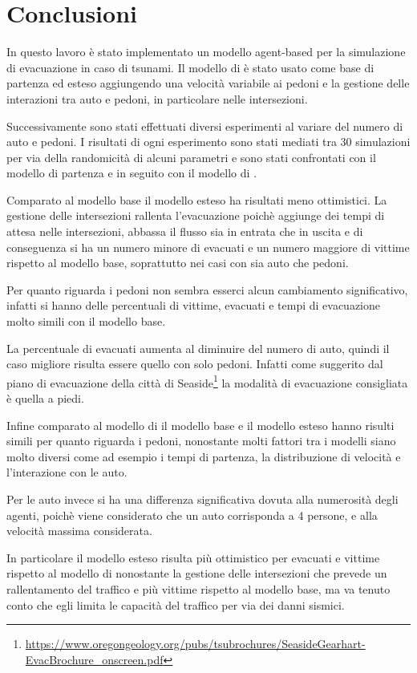\section{Conclusioni}
\label{sec:conclusione}
In questo lavoro è stato implementato un modello agent-based per la simulazione di evacuazione in caso di tsunami.
Il modello di \textcite{wang2016agent} è stato usato come base di partenza ed esteso aggiungendo una velocità
variabile ai pedoni e la gestione delle interazioni tra auto e pedoni, in particolare nelle intersezioni.

Successivamente sono stati effettuati diversi esperimenti al variare del numero di auto e pedoni.
I risultati di ogni esperimento sono stati mediati tra 30 simulazioni per via della randomicità di alcuni parametri
e sono stati confrontati con il modello di partenza e in seguito con il modello di \textcite{wang2021novel}.

Comparato al modello base il modello esteso ha risultati meno ottimistici.
La gestione delle intersezioni rallenta l'evacuazione poichè aggiunge dei tempi di attesa nelle intersezioni,
abbassa il flusso sia in entrata che in uscita e di conseguenza si ha un numero minore di evacuati e
un numero maggiore di vittime rispetto al modello base, soprattutto nei casi con sia auto che pedoni.

Per quanto riguarda i pedoni non sembra esserci alcun cambiamento significativo,
infatti si hanno delle percentuali di vittime, evacuati e tempi di evacuazione molto simili con il modello base.

La percentuale di evacuati aumenta al diminuire del numero di auto, quindi il caso migliore risulta essere quello con solo pedoni.
Infatti come suggerito dal piano di evacuazione della città di Seaside\footnote{\url{https://www.oregongeology.org/pubs/tsubrochures/SeasideGearhart-EvacBrochure_onscreen.pdf}}
la modalità di evacuazione consigliata è quella a piedi.

Infine comparato al modello di \textcite{wang2021novel} il modello base e il modello esteso hanno risulti simili per quanto riguarda i pedoni, nonostante
molti fattori tra i modelli siano molto diversi come ad esempio i tempi di partenza, la distribuzione di velocità e l'interazione con le auto.

Per le auto invece si ha una differenza significativa dovuta alla numerosità degli agenti, poichè viene considerato che un auto corrisponda a 4 persone, e alla 
velocità massima considerata. 

In particolare il modello esteso risulta più ottimistico per evacuati e vittime rispetto al modello di \textcite{wang2021novel} nonostante la gestione delle intersezioni
che prevede un rallentamento del traffico e più vittime rispetto al modello base, ma va tenuto conto che egli limita le capacità del traffico per via dei danni sismici.

